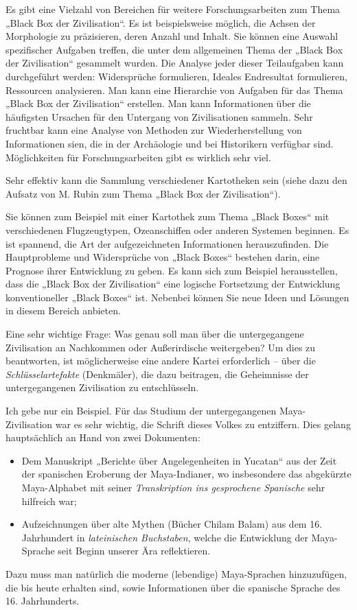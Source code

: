 \documentclass[11pt,a4paper]{article}
\begin{document}
Es gibt eine Vielzahl von Bereichen für weitere Forschungsarbeiten zum Thema
„Black Box der Zivilisation“. Es ist beispielsweise möglich, die Achsen der
Morphologie zu präzisieren, deren Anzahl und Inhalt. Sie können eine Auswahl
spezifischer Aufgaben treffen, die unter dem allgemeinen Thema der „Black Box
der Zivilisation“ gesammelt wurden. Die Analyse jeder dieser Teilaufgaben kann
durchgeführt werden: Widersprüche formulieren, Ideales Endresultat
formulieren, Ressourcen analysieren.  Man kann eine Hierarchie von Aufgaben
für das Thema „Black Box der Zivilisation“ erstellen. Man kann Informationen
über die häufigsten Ursachen für den Untergang von Zivilisationen
sammeln. Sehr fruchtbar kann eine Analyse von Methoden zur Wiederherstellung
von Informationen sien, die in der Archäologie und bei Historikern verfügbar
sind.  Möglichkeiten für Forschungsarbeiten gibt es wirklich sehr viel.

Sehr effektiv kann die Sammlung verschiedener Kartotheken sein (siehe dazu den
Aufsatz \cite{RubinXX} von M. Rubin zum Thema „Black Box der Zivilisation“).

Sie können zum Beispiel mit einer Kartothek zum Thema „Black Boxes“ mit
verschiedenen Flugzeugtypen, Ozeanschiffen oder anderen Systemen beginnen. Es
ist spannend, die Art der aufgezeichneten Informationen herauszufinden. Die
Hauptprobleme und Widersprüche von „Black Boxes“ bestehen darin, eine Prognose
ihrer Entwicklung zu geben. Es kann sich zum Beispiel herausstellen, dass die
„Black Box der Zivilisation“ eine logische Fortsetzung der Entwicklung
konventioneller „Black Boxes“ ist. Nebenbei können Sie neue Ideen und Lösungen
in diesem Bereich anbieten.

Eine sehr wichtige Frage: Was genau soll man über die untergegangene
Zivilisation an Nachkommen oder Außerirdische weitergeben? Um dies zu
beantworten, ist möglicherweise eine andere Kartei erforderlich -- über die
\emph{Schlüsselartefakte} (Denkmäler), die dazu beitragen, die Geheimnisse der
untergegangenen Zivilisation zu entschlüsseln.

Ich gebe nur ein Beispiel. Für das Studium der untergegangenen
Maya-Zivilisation war es sehr wichtig, die Schrift dieses Volkes zu
entziffern.  Dies gelang hauptsächlich an Hand von zwei
Dokumenten: 
\begin{itemize}[noitemsep]
\item Dem Manuskript „Berichte über Angelegenheiten in Yucatan“ aus der Zeit
  der spanischen Eroberung der Maya-Indianer, wo insbesondere das abgekürzte
  Maya-Alphabet mit seiner \emph{Transkription ins gesprochene Spanische} sehr
  hilfreich war;
\item Aufzeichnungen über alte Mythen (Bücher Chilam Balam) aus dem
  16. Jahrhundert in \emph{lateinischen Buchstaben}, welche die Entwicklung
  der Maya-Sprache seit Beginn unserer Ära reflektieren.
\end{itemize}
Dazu muss man natürlich die moderne (lebendige) Maya-Sprachen hinzuzufügen,
die bis heute erhalten sind, sowie Informationen über die spanische Sprache
des 16. Jahrhunderts.
\end{document}
